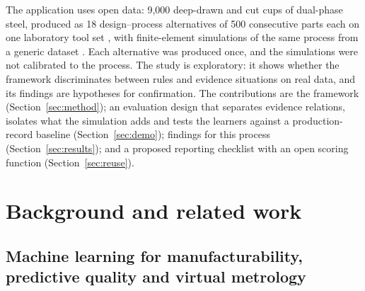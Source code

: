 \documentclass[pdflatex,sn-basic,lineno]{sn-jnl}
\begin{document}
The application uses open data: 9,000 deep-drawn and cut cups of dual-phase steel, produced as 18 design--process alternatives of 500 consecutive parts each on one laboratory tool set \citep{baum2026rddac}, with finite-element simulations of the same process from a generic dataset \citep{baum2025ddacs}. Each alternative was produced once, and the simulations were not calibrated to the process. The study is exploratory: it shows whether the framework discriminates between rules and evidence situations on real data, and its findings are hypotheses for confirmation. The contributions are the framework (Section~\ref{sec:method}); an evaluation design that separates evidence relations, isolates what the simulation adds and tests the learners against a production-record baseline (Section~\ref{sec:demo}); findings for this process (Section~\ref{sec:results}); and a proposed reporting checklist with an open scoring function (Section~\ref{sec:reuse}).

\section{Background and related work}\label{sec:background}

\subsection{Machine learning for manufacturability, predictive quality and virtual metrology}
\end{document}

